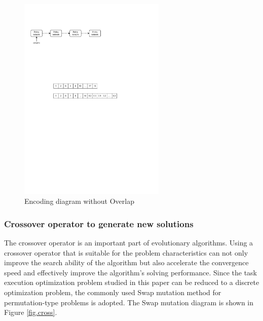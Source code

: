 \documentclass[10pt]{mcmthesis}
\begin{document}
\begin{figure}[H]
    \centering
    \includegraphics[width=7.0cm]{figures/NoOverlap.pdf}
    \caption{ Encoding diagram without Overlap }%
    \label{fig.noover}
\end{figure} 
\vspace{-15pt}


\subsubsection{Crossover operator to generate new solutions}

The crossover operator is an important part of evolutionary algorithms. Using a crossover operator that is suitable for the problem characteristics can not only improve the search ability of the algorithm but also accelerate the convergence speed and effectively improve the algorithm's solving performance. Since the task execution optimization problem studied in this paper can be reduced to a discrete optimization problem, the commonly used Swap mutation method for permutation-type problems is adopted. The Swap mutation diagram is shown in Figure \ref{fig.cross}.
\end{document}
